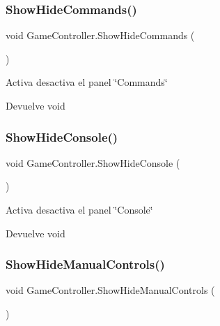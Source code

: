 \subsubsection{\texorpdfstring{ShowHideCommands()}{ShowHideCommands()}}
{\footnotesize\ttfamily void Game\+Controller.\+Show\+Hide\+Commands (\begin{DoxyParamCaption}{ }\end{DoxyParamCaption})\hspace{0.3cm}{\ttfamily [inline]}}

Activa desactiva el panel \char`\"{}\+Commands\char`\"{} \begin{DoxyReturn}{Devuelve}
void 
\end{DoxyReturn}
\mbox{\label{class_game_controller_ad037a03af50093f97a244acb6ee7cfb5}} 
\subsubsection{\texorpdfstring{ShowHideConsole()}{ShowHideConsole()}}
{\footnotesize\ttfamily void Game\+Controller.\+Show\+Hide\+Console (\begin{DoxyParamCaption}{ }\end{DoxyParamCaption})\hspace{0.3cm}{\ttfamily [inline]}}

Activa desactiva el panel \char`\"{}\+Console\char`\"{} \begin{DoxyReturn}{Devuelve}
void 
\end{DoxyReturn}
\mbox{\label{class_game_controller_ab55a4d6d21f7e08aac2e27ad92033d56}} 
\subsubsection{\texorpdfstring{ShowHideManualControls()}{ShowHideManualControls()}}
{\footnotesize\ttfamily void Game\+Controller.\+Show\+Hide\+Manual\+Controls (\begin{DoxyParamCaption}{ }\end{DoxyParamCaption})\hspace{0.3cm}{\ttfamily [inline]}}

